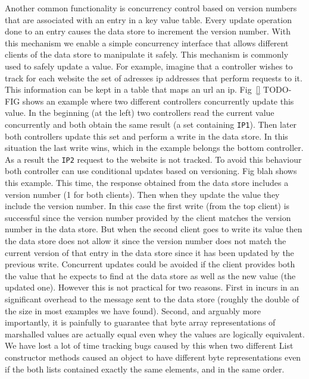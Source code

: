 Another common functionality is concurrency control based on version numbers that are associated with an entry in a key value table.
Every update operation done to an entry causes the data store to increment the version number. 
With this mechanism we enable a simple concurrency interface that allows different clients of the data store to manipulate it safely. 
This mechanism is commonly used to safely update a value.  
For example, imagine that a controller wishes to track for each website the set of adresses \gls{ip} addresses that perform requests to it. 
This information can be kept in a table that maps  an \gls{url} an \gls{ip}.  Fig~\ref{} TODO-FIG shows an example where two different controllers concurrently update this value. 
In the beginning (at the left) two controllers read the current value concurrently and both obtain the same result (a set containing \texttt{IP1}). Then later both controllers update this set and perform a write in the data store. In this situation the last write wins, which in the example belongs the bottom controller. 
As a result the \texttt{IP2} request to the website is not tracked. To avoid this behaviour both controller can use conditional updates based on versioning. 
Fig blah shows this example. This time, the response obtained from the data store includes a version number (1 for both clients). Then when they update the value they include the version number. In this case the first write (from the top client) is successful since the version number provided by the client matches the version number in the data store. But when the second client goes to write its  value then the data store does not allow it since the version number does not match the current version of that entry in the data store since it has been updated by the previous write. 
Concurrent updates could be avoided if the client provides both the value that he expects to find at the data store as well as the new value (the updated one). However this is not practical for two reasons. First in incurs in an significant overhead to the message sent to the data store (roughly the double of the size in most examples we have found). Second, and arguably more importantly, it is painfully to guarantee that byte array representations of marshalled values are actually equal even whey the values are logically equivalent. We have lost a lot of time tracking bugs caused by this when two different List constructor methods caused an object to have different byte representations even if the both lists contained exactly the same elements, and in the same order. 

